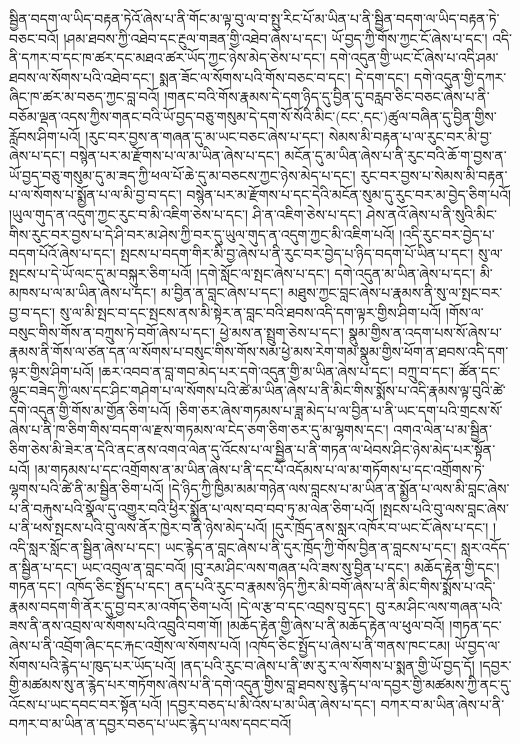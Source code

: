 སྦྱིན་བདག་ལ་ཡིད་བརྟན་ཏེའོ་ཞེས་པ་ནི་གོང་མ་ལྟ་བུ་ལ་བ་སྤུ་རིང་པོ་མ་ཡིན་པ་ནི་སྦྱིན་བདག་ལ་ཡིད་བརྟན་ཏེ་བཅང་བའོ། །ཤམ་ཐབས་ཀྱི་འཐེབ་དང་རྔུལ་གཟན་གྱི་འཐེབ་ཞེས་པ་དང་། ཡོ་བྱད་ཀྱི་གོས་ཀྱང་ངོ་ཞེས་པ་དང་། འདི་ནི་དཀར་བ་དང་ཁ་ཚར་དང་མཐའ་ཚར་ཡོད་ཀྱང་ཉེས་མེད་ཅེས་པ་དང་། དགེ་འདུན་གྱི་ཡང་ངོ་ཞེས་པ་འདི་ཤམ་ཐབས་ལ་སོགས་པའི་འཐེབ་དང་། སྨན་ཟོང་ལ་སོགས་པའི་གོས་བཅང་བ་དང་། དེ་དག་དང་། དགེ་འདུན་གྱི་དཀར་ཞིང་ཁ་ཚར་མ་བཅད་ཀྱང་བླ་བའོ། །གནང་བའི་གོས་རྣམས་དེ་དག་ཉིད་དུ་བྱིན་དུ་བརླབ་ཅིང་བཅང་ཞེས་པ་ནི་བཅོམ་ལྡན་འདས་ཀྱིས་གནང་བའི་ཡོ་བྱད་བཅུ་གསུམ་དེ་དག་སོ་སོའི་མིང་(ངང་‚དང་)ཚུལ་བཞིན་དུ་བྱིན་གྱིས་རློབས་ཤིག་པའོ། །རུང་བར་བྱས་ན་གཞན་དུ་མ་ཡང་བཅང་ཞེས་པ་དང་། སེམས་མི་བརྟན་པ་ལ་རུང་བར་མི་བྱ་ཞེས་པ་དང་། བསྙེན་པར་མ་རྫོགས་པ་ལ་མ་ཡིན་ཞེས་པ་དང་། མངོན་དུ་མ་ཡིན་ཞེས་པ་ནི་རུང་བའི་ཆོ་ག་བྱས་ན་ཡོ་བྱད་བཅུ་གསུམ་དུ་མ་ཟད་ཀྱི་ཕལ་པོ་ཆེ་དུ་མ་བཅངས་ཀྱང་ཉེས་མེད་པ་དང་། རུང་བར་བྱས་པ་སེམས་མི་བརྟན་པ་ལ་སོགས་པ་སྨྱོན་པ་ལ་མི་བྱ་བ་དང་། བསྙེན་པར་མ་རྫོགས་པ་དང་དེའི་མངོན་སུམ་དུ་རུང་བར་མ་བྱེད་ཅིག་པའོ། །ཡུལ་གུད་ན་འདུག་ཀྱང་རུང་བ་མི་འཇིག་ཅེས་པ་དང་། ཤི་ན་འཇིག་ཅེས་པ་དང་། ཤེས་ནའོ་ཞེས་པ་ནི་སུའི་མིང་གིས་རུང་བར་བྱས་པ་དེ་ཤི་བར་མ་ཤེས་ཀྱི་བར་དུ་ཡུལ་གུད་ན་འདུག་ཀྱང་མི་འཇིག་པའོ། །འདི་རུང་བར་བྱེད་པ་བདག་པོའོ་ཞེས་པ་དང་། སྤངས་པ་བདག་གིར་མི་བྱ་ཞེས་པ་ནི་རུང་བར་བྱེད་པ་ཉིད་བདག་པོ་ཡིན་པ་དང་། སུ་ལ་སྤངས་པ་དེ་ཡོ་ལང་དུ་མ་བསྐུར་ཅིག་པའོ། །དགེ་སློང་ལ་སྤང་ཞེས་པ་དང་། དགེ་འདུན་མ་ཡིན་ཞེས་པ་དང་། མི་མཁས་པ་ལ་མ་ཡིན་ཞེས་པ་དང་། མ་བྱིན་ན་བླང་ཞེས་པ་དང་། མཐུས་ཀྱང་བླང་ཞེས་པ་རྣམས་ནི་སུ་ལ་སྤང་བར་བྱ་བ་དང་། སུ་ལ་མི་སྤང་བ་དང་སྤངས་ནས་མི་སྟེར་ན་བླང་བའི་ཐབས་འདི་དག་ལྟར་གྱིས་ཤིག་པའོ། །གོས་ལ་བསུང་གིས་གོས་ན་བཀྲུས་ཏེ་བགོ་ཞེས་པ་དང་། ཕྱེ་མས་ན་སྤྲུག་ཅེས་པ་དང་། སྣུམ་གྱིས་ན་འདག་པས་སོ་ཞེས་པ་རྣམས་ནི་གོས་ལ་ཙན་དན་ལ་སོགས་པ་བསུང་གིས་གོས་སམ་ཕྱེ་མས་རེག་གམ་སྣུམ་གྱིས་ཕོག་ན་ཐབས་འདི་དག་ལྟར་གྱིས་ཤིག་པའོ། །ཆར་འབབ་ན་བླ་གབ་མེད་པར་དགེ་འདུན་གྱི་མ་ཡིན་ཞེས་པ་དང་། བཀྲུ་བ་དང་། ཚོན་དང་ལྷུང་བཟེད་ཀྱི་ལས་དང་ཤིང་གཤེག་པ་ལ་སོགས་པའི་ཚེ་མ་ཡིན་ཞེས་པ་ནི་མིང་གིས་སྨོས་པ་འདི་རྣམས་ལྟ་བུའི་ཚེ་དགེ་འདུན་གྱི་གོས་མ་གྱོན་ཅིག་པའོ། །ཅིག་ཅར་ཞེས་གཏམས་པ་ཟླ་མེད་པ་ལ་བྱིན་པ་ནི་ཡང་དག་པའི་གྲངས་སོ་ཞེས་པ་ནི་ཁ་ཅིག་གིས་བདག་ལ་རྫས་གཏམས་ལ་ངེད་ཅག་ཅིག་ཅར་དུ་མ་ལྷགས་དང་། འགའ་ལེན་པ་མ་སྦྱིན་ཅིག་ཅེས་མི་ཟེར་ན་དེའི་ནང་ནས་འགའ་ལེན་དུ་འོངས་པ་ལ་སྦྱིན་པ་ནི་གཏན་ལ་ཕེབས་ཤིང་ཉེས་མེད་པར་སྟོན་པའོ། །མ་གཏམས་པ་དང་འགྲོགས་ན་མ་ཡིན་ཞེས་པ་ནི་དང་པོ་འདོམས་པ་ལ་མ་གཏོགས་པ་དང་འགྲོགས་ཏེ་ལྷགས་པའི་ཚེ་ནི་མ་སྦྱིན་ཅིག་པའོ། །དེ་ཉིད་ཀྱི་ཁྱིམ་མམ་གཉེན་ལས་བླངས་པ་མ་ཡིན་ན་སྨྱོན་པ་ལས་མི་བླང་ཞེས་པ་ནི་བརྐུས་པའི་སྣོལ་དུ་འགྱུར་བའི་ཕྱིར་སྨྱོན་པ་ལས་བབ་བབ་ཏུ་མ་ལེན་ཅིག་པའོ། །སྤངས་པའི་བུ་ལས་བླང་ཞེས་པ་ནི་ཕས་སྤངས་པའི་བུ་ལས་ནོར་ཁྱེར་བ་ནི་ཉེས་མེད་པའོ། །དུར་ཁྲོད་ནས་སླར་འཁོར་བ་ཡང་ངོ་ཞེས་པ་དང་། །འདི་སླར་སློང་ན་སྦྱིན་ཞེས་པ་དང་། ཡང་རྙེད་ན་བླང་ཞེས་པ་ནི་དུར་ཁྲོད་ཀྱི་གོས་བྱིན་ན་བླངས་པ་དང་། སླར་འདོད་ན་སྦྱིན་པ་དང་། ཡང་འབུལ་ན་བླང་བའོ། །བུ་རམ་ཤིང་ལས་གཞན་པའི་ཟས་སུ་བྱིན་པ་དང་། མཆོད་རྟེན་གྱི་དང་། གཏན་དང་། འཁོད་ཅིང་སྤྱོད་པ་དང་། ནད་པའི་རུང་བ་རྣམས་ཉིད་ཀྱིར་མི་བགོ་ཞེས་པ་ནི་མིང་གིས་སྨོས་པ་འདི་རྣམས་བདག་གི་ནོར་དུ་བྱ་བར་མ་འགོད་ཅིག་པའོ། །དེ་ལ་རྩ་བ་དང་འབྲས་བུ་དང་། བུ་རམ་ཤིང་ལས་གཞན་པའི་ཟས་ནི་ནས་འབྲས་ལ་སོགས་པའི་འབྲུའི་བག་གོ། །མཆོད་རྟེན་གྱི་ཞེས་པ་ནི་མཆོད་རྟེན་ལ་ཕུལ་བའོ། །གཏན་དང་ཞེས་པ་ནི་འབྲོག་ཞིང་དང་རྐང་འགྲོས་ལ་སོགས་པའོ། །འཁོད་ཅིང་སྤྱོད་པ་ཞེས་པ་ནི་གནས་ཁང་ངམ། ཡོ་བྱད་ལ་སོགས་པའི་རྙེད་པ་ཁུད་པར་ཡོད་པའོ། །ནད་པའི་རུང་བ་ཞེས་པ་ནི་ཨ་རུ་ར་ལ་སོགས་པ་སྨན་གྱི་ཡོ་བྱད་དོ། །དབྱར་གྱི་མཚམས་སུ་ན་རྙེད་པར་གཏོགས་ཞེས་པ་ནི་དགེ་འདུན་གྱིས་བླ་ཐབས་སུ་རྙེད་པ་ལ་དབྱར་གྱི་མཚམས་ཀྱི་ནང་དུ་འོངས་པ་ཡང་དབང་བར་སྟོན་པའོ། །དབྱར་བཅད་པ་མི་འོས་པ་མ་ཡིན་ཞེས་པ་དང་། བཀར་བ་མ་ཡིན་ཞེས་པ་ནི་བཀར་བ་མ་ཡིན་ན་དབྱར་བཅད་པ་ཡང་རྙེད་པ་ལས་དབང་བའོ། 